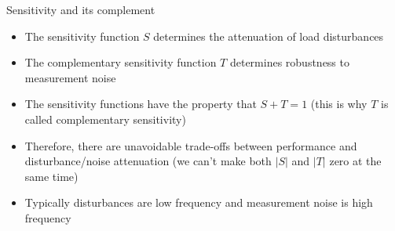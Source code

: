 \documentclass{beamer-control}
\begin{document}
\begin{frame}{Sensitivity and its complement}
\begin{itemize}
	\item The sensitivity function $S$ determines the attenuation of load disturbances
	\item The complementary sensitivity function $T$ determines robustness to measurement noise
	\item The sensitivity functions have the property that $S+T=1$ (this is why $T$ is called complementary sensitivity)
	\item Therefore, there are unavoidable trade-offs between performance and disturbance/noise attenuation (we can't make both $|S|$ and $|T|$ zero at the same time)
	\item Typically disturbances are low frequency and measurement noise is high frequency 
\end{itemize}
\end{frame}

\SUMMARYFRAME
\FINALE
\end{document}
